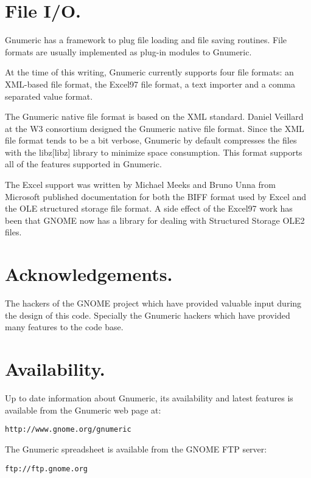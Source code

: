 \documentclass[12pt,twoside,twocolumn]{article}
\begin{document}
\section{File I/O.}

Gnumeric has a framework to plug file loading and file saving
routines.  File formats are usually implemented as plug-in modules to
Gnumeric. 

At the time of this writing, Gnumeric currently supports four file
formats: an XML-based file format, the Excel97 file format, a text
importer and a comma separated value format.

The Gnumeric native file format is based on the XML standard.  Daniel
Veillard at the W3 consortium designed the Gnumeric native file
format.  Since the XML file format tends to be a bit verbose, Gnumeric
by default compresses the files with the libz[libz] library to
minimize space consumption.  This format supports all of the features
supported in Gnumeric. 

The Excel support was written by Michael Meeks and Bruno Unna from
Microsoft published documentation for both the BIFF format used by
Excel and the OLE structured storage file format.  A side effect of
the Excel97 work has been that GNOME now has a library for dealing
with Structured Storage OLE2 files.

\section{Acknowledgements.}

The hackers of the GNOME project which have provided valuable input
during the design of this code.  Specially the Gnumeric hackers which
have provided many features to the code base.

\section{Availability.}

Up to date information about Gnumeric, its availability and latest
features is available from the Gnumeric web page at: 

\begin{center}\small
{\texttt {http://www.gnome.org/gnumeric}}
\end{center}

The Gnumeric spreadsheet is available from the GNOME FTP server:

\begin{center}\small
	{\texttt{ftp://ftp.gnome.org}}
\end{center}
\end{document}
